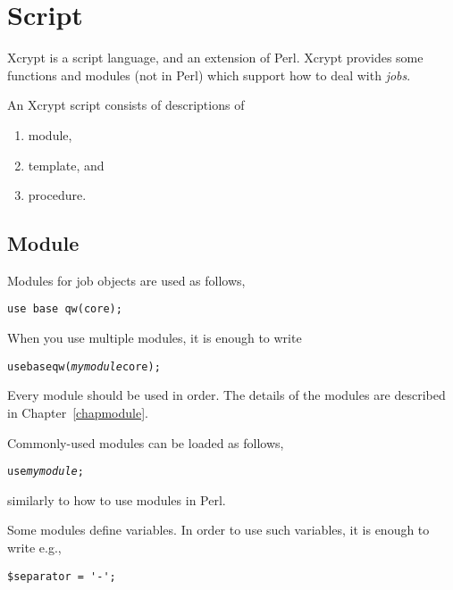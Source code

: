 \documentclass[a4paper,10pt]{report}
\begin{document}
\chapter{Script}

Xcrypt is a script language, and an extension of Perl.  Xcrypt provides
some functions and modules (not in Perl) which support how to deal
with \textit{jobs}.

An Xcrypt script consists of descriptions of
\begin{enumerate}
 \item module,
 \item template, and
 \item procedure.
\end{enumerate}

\section{Module}

Modules for job objects are used as follows,
\begin{boxnote}
\begin{verbatim}
use base qw(core);
\end{verbatim}
\end{boxnote}
\vspace{\baselineskip}

When you use multiple modules, it is enough to write
\begin{boxnote}
\begin{alltt}
use base qw(\textit{mymodule} core);
\end{alltt}
\end{boxnote}
\vspace{\baselineskip}
\noindent
Every module should be used in order.
The details of the modules are described in Chapter~\ref{chapmodule}.

Commonly-used modules can be loaded as follows,
\begin{boxnote}
\begin{alltt}
use \textit{mymodule};
\end{alltt}
\end{boxnote}
\vspace{\baselineskip}
\noindent
similarly to how to use modules in Perl.

Some modules define variables.
In order to use such variables, it is enough to write e.g.,
\begin{boxnote}
\begin{verbatim}
$separator = '-';
\end{verbatim}
\end{boxnote}
\end{document}
